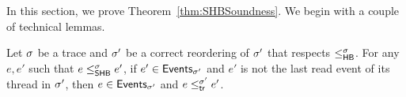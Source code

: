 
In this section, we prove Theorem~\ref{thm:SHBSoundness}. We begin
with a couple of technical lemmas.

\begin{lemma}\label{lem:cr_hb}
Let $\sigma$ be a trace and $\sigma'$ be a correct reordering of $\sigma'$ that
respects $\leq^{\sigma}_{\mathsf{HB}}$.  For any $e,e'$ such that $e \leq^{\sigma}_{\mathsf{SHB}} e'$, if
$e' \in \mathsf{Events}_{\sigma'}$ and $e'$ is not the last read event of its
thread in $\sigma'$, then $e \in \mathsf{Events}_{\sigma'}$ and $e \leq^{\sigma'}_{\mathsf{tr}} e'$.
\end{lemma}

